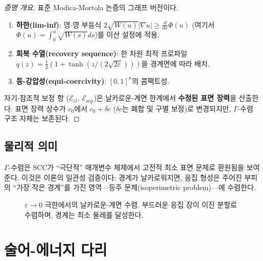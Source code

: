 \begin{proof}[증명 개요]
표준 Modica-Mortola 논증의 그래프 버전이다.
\begin{enumerate}
    \item \textbf{하한(lim-inf)}: 영-영 부등식 $2\sqrt{W(u)} |\nabla u| \geq \frac{d}{dx}\Phi(u)$ (여기서 $\Phi(u) = \int_0^u \sqrt{W(s)} ds$)를 이산 설정에 적용.
    \item \textbf{회복 수열(recovery sequence)}: 한 차원 최적 프로파일 $q(z) = \frac{1}{2}(1 + \tanh(z/(2\sqrt{2\varepsilon})))$을 경계면에 따라 배치.
    \item \textbf{등-강압성(equi-coercivity)}: $[0,1]^n$의 콤팩트성.
\end{enumerate}
자기-참조적 보정 항 ($\mathcal{E}_{\mathrm{cl}}$, $\mathcal{E}_{\mathrm{sep}}$)은 날카로운-계면 한계에서 \textbf{수정된 표면 장력}을 산출한다. 표면 장력 상수가 $c_0$에서 $c_0 + \delta c$ ($\delta c$는 폐합 및 구별 보정)로 변경되지만, $\Gamma$-수렴 구조 자체는 보존된다.
\end{proof}

\subsection{물리적 의미}

$\Gamma$-수렴은 SCC가 ``극단적'' 매개변수 체제에서 고전적 최소 표면 문제로 환원됨을 보여준다. 이것은 이론의 일관성 검증이다: 경계가 날카로워지면, 응집 형성은 주어진 부피의 ``가장 작은 경계''를 가진 영역---등주 문제(isoperimetric problem)---에 수렴한다.

\begin{figure}[t]
\centering
\caption{$\varepsilon \to 0$ 극한에서의 날카로운-계면 수렴. 부드러운 응집 장이 이진 분할로 수렴하며, 경계는 최소 둘레를 달성한다.}
\label{fig:sharp-interface}
\end{figure}


\section{술어-에너지 다리}
\label{sec:predicate-energy-bridge}

